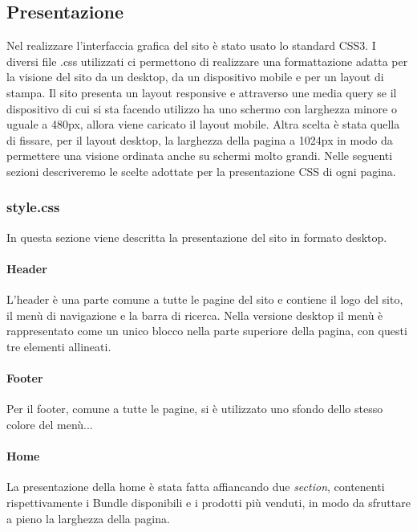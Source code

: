 \subsection{Presentazione}
Nel realizzare l'interfaccia grafica del sito è stato usato lo standard CSS3.\newline
I diversi file .css utilizzati ci permettono di realizzare una formattazione adatta per la visione del sito da un desktop, da un dispositivo mobile e per un layout di stampa. \newline
Il sito presenta un layout responsive e attraverso une media query se il dispositivo di cui si sta facendo utilizzo ha uno schermo con larghezza minore o uguale a 480px, allora viene caricato il layout mobile.\newline
Altra scelta è stata quella di fissare, per il layout desktop, la larghezza della pagina a 1024px in modo da permettere una visione ordinata anche su schermi molto grandi.\newline
Nelle seguenti sezioni descriveremo le scelte adottate per la presentazione CSS di ogni pagina.

\subsubsection{style.css}
In questa sezione viene descritta la presentazione del sito in formato desktop.

\paragraph{Header} \Spazio
L'header è una parte comune a tutte le pagine del sito e contiene il logo del sito, il menù di navigazione e la barra di ricerca.\newline
Nella versione desktop il menù è rappresentato come un unico blocco nella parte superiore della pagina, con questi tre elementi allineati.

\paragraph{Footer} \Spazio
Per il footer, comune a tutte le pagine, si è utilizzato uno sfondo dello stesso colore del menù... 


\paragraph{Home} \Spazio
La presentazione della home è stata fatta affiancando due \emph{section}, contenenti rispettivamente i Bundle disponibili e i prodotti più venduti, in modo da sfruttare a pieno la larghezza della pagina.\newline 


